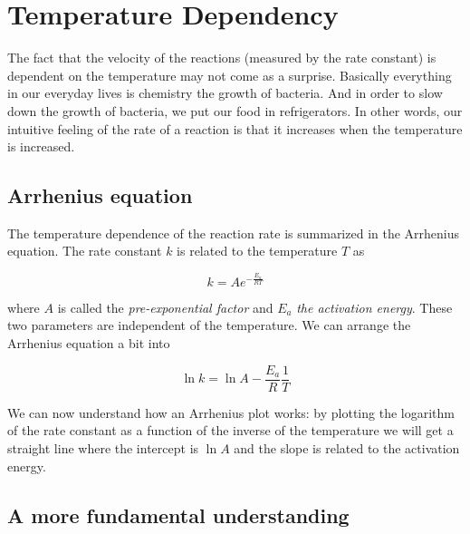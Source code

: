 
\chapter{Temperature Dependency}
\label{chap:Temperature}

The fact that the velocity of the reactions (measured by the rate constant) is dependent on the temperature may not come as a surprise. Basically everything in our everyday lives is chemistry \eg the growth of bacteria. And in order to slow down the growth of bacteria, we put our food in refrigerators. In other words, our intuitive feeling of the rate of a reaction is that it increases when the temperature is increased.

\section{Arrhenius equation}
\label{sect:Arrhenius}

The temperature dependence of the reaction rate is summarized in the Arrhenius equation. The rate constant $k$ is related to the temperature $T$ as

\begin{equation}
    \label{eq:Arrhenius}
    k = Ae^{-\frac{E_a}{RT}}
\end{equation}

where $A$ is called the \textit{pre-exponential factor} and $E_a$ \textit{the activation energy}. These two parameters are independent of the temperature. We can arrange the Arrhenius equation a bit into

\begin{equation}
    \ln k = \ln A - \frac{E_a}{R} \frac{1}{T}
\end{equation}

We can now understand how an Arrhenius plot works: by plotting the logarithm of the rate constant as a function of the inverse of the temperature we will get a straight line where the intercept is $\ln A$ and the slope is related to the activation energy.

\section{A more fundamental understanding}
\label{sect:ArrheniusExplained}

